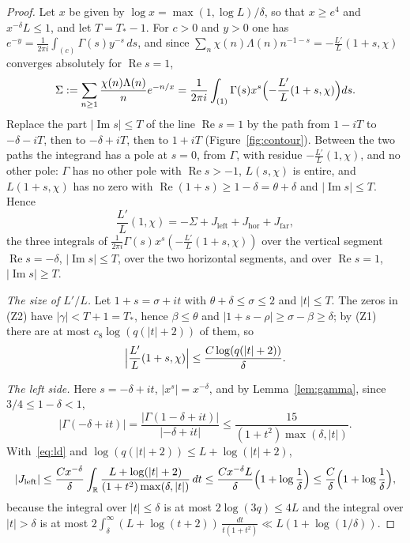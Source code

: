 \documentclass[11pt,a4paper,reqno]{amsart}
\theoremstyle{remark}
\numberwithin{equation}{section}
\renewcommand{\Re}{\operatorname{Re}}
\renewcommand{\Im}{\operatorname{Im}}
\newcommand{\R}{\mathbb{R}}
\begin{document}
\begin{proof}
Let $x$ be given by $\log x=\max(1,\log L)/\delta$, so that $x\ge e^4$ and $x^{-\delta}L\le1$, and let $T=T_*-1$. For $c>0$ and $y>0$ one has $e^{-y}=\frac1{2\pi i}\int_{(c)}\Gamma(s)y^{-s}\,ds$, and since $\sum_n\chi(n)\Lambda(n)n^{-1-s}=-\frac{L'}{L}(1+s,\chi)$ converges absolutely for $\Re s=1$,
\begin{equation}\label{eq:mellin}
  \Sigma:=\sum_{n\ge1}\frac{\chi(n)\Lambda(n)}ne^{-n/x}=\frac1{2\pi i}\int_{(1)}\Gamma(s)x^s\Bigl(-\frac{L'}{L}(1+s,\chi)\Bigr)ds.
\end{equation}
Replace the part $|\Im s|\le T$ of the line $\Re s=1$ by the path from $1-iT$ to $-\delta-iT$, then to $-\delta+iT$, then to $1+iT$ (Figure~\ref{fig:contour}). Between the two paths the integrand has a pole at $s=0$, from $\Gamma$, with residue $-\frac{L'}{L}(1,\chi)$, and no other pole: $\Gamma$ has no other pole with $\Re s>-1$, $L(s,\chi)$ is entire, and $L(1+s,\chi)$ has no zero with $\Re(1+s)\ge1-\delta=\theta+\delta$ and $|\Im s|\le T$. Hence
\[
  \frac{L'}{L}(1,\chi)=-\Sigma+J_{\mathrm{left}}+J_{\mathrm{hor}}+J_{\mathrm{far}},
\]
the three integrals of $\frac1{2\pi i}\Gamma(s)x^s(-\frac{L'}{L}(1+s,\chi))$ over the vertical segment $\Re s=-\delta$, $|\Im s|\le T$, over the two horizontal segments, and over $\Re s=1$, $|\Im s|\ge T$.

\emph{The size of $L'/L$.} Let $1+s=\sigma+it$ with $\theta+\delta\le\sigma\le2$ and $|t|\le T$. The zeros in (Z2) have $|\gamma|<T+1=T_*$, hence $\beta\le\theta$ and $|1+s-\rho|\ge\sigma-\beta\ge\delta$; by (Z1) there are at most $c_8\log(q(|t|+2))$ of them, so
\begin{equation}\label{eq:ld}
  \Bigl|\frac{L'}{L}(1+s,\chi)\Bigr|\le\frac{C\log(q(|t|+2))}\delta .
\end{equation}

\emph{The left side.} Here $s=-\delta+it$, $|x^s|=x^{-\delta}$, and by Lemma~\ref{lem:gamma}, since $3/4\le1-\delta<1$,
\[
  |\Gamma(-\delta+it)|=\frac{|\Gamma(1-\delta+it)|}{|-\delta+it|}\le\frac{15}{(1+t^2)\max(\delta,|t|)} .
\]
With~\eqref{eq:ld} and $\log(q(|t|+2))\le L+\log(|t|+2)$,
\[
  |J_{\mathrm{left}}|\le\frac{Cx^{-\delta}}\delta\int_{\R}\frac{L+\log(|t|+2)}{(1+t^2)\max(\delta,|t|)}\,dt\le\frac{Cx^{-\delta}L}\delta\Bigl(1+\log\frac1\delta\Bigr)\le\frac C\delta\Bigl(1+\log\frac1\delta\Bigr),
\]
because the integral over $|t|\le\delta$ is at most $2\log(3q)\le4L$ and the integral over $|t|>\delta$ is at most $2\int_\delta^\infty(L+\log(t+2))\,\frac{dt}{t(1+t^2)}\ll L(1+\log(1/\delta))$.


\end{proof}
\end{document}
